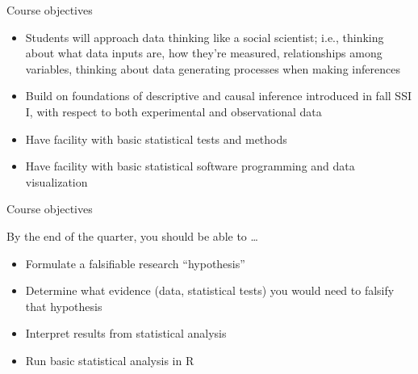\documentclass[xcolor={dvipsnames}, handout]{beamer}
\begin{document}
\begin{frame}{Course objectives}
\pause
\begin{itemize}
\item Students will approach data thinking like a social scientist; i.e., thinking about what data inputs are, how they’re measured, relationships among variables, thinking about data generating processes when making inferences\pause
\item Build on foundations of descriptive and causal inference introduced in fall SSI I, with respect to both experimental and observational data \pause
\item Have facility with basic statistical tests and methods \pause
\item Have facility with basic statistical software programming and data visualization 
\end{itemize}

\end{frame}



\begin{frame}{Course objectives}

By the end of the quarter, you should be able to \dots\pause
\begin{itemize}
\item Formulate a falsifiable research ``hypothesis'' \pause
\item Determine what evidence (data, statistical tests) you would need to falsify that hypothesis \pause
\item Interpret results from statistical analysis \pause
\item Run basic statistical analysis in R
\end{itemize}

\end{frame}


\end{document}
